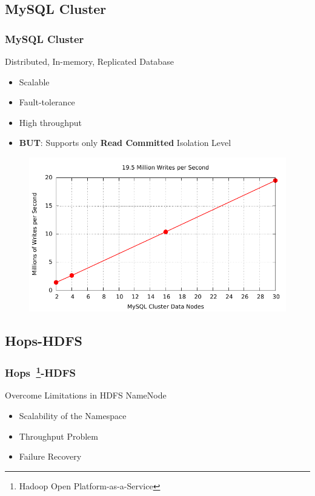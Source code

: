 \documentclass{beamer}
\begin{document}
\subsection{MySQL Cluster}
\begin{frame}
	\frametitle{MySQL Cluster}
	\begin{block}{Distributed, In-memory, Replicated Database}
			\begin{itemize}
				\item Scalable
				\item Fault-tolerance
				\item High throughput
				\item \textbf{BUT}: Supports only \textbf{Read Committed} Isolation Level
			\end{itemize}
	\end{block}
\begin{figure}[h!]
	\centering
	\includegraphics[scale=0.6]{figs/mysqlclusterbenchmark.pdf}
\end{figure}
\end{frame}

\subsection{Hops-HDFS}
\begin{frame}
	\frametitle{Hops~\footnote{Hadoop Open Platform-as-a-Service}-HDFS}
		\begin{block}{Overcome Limitations in HDFS NameNode}
			\begin{itemize}
				\item Scalability of the Namespace  
				\item Throughput Problem
				\item Failure Recovery
			\end{itemize}
		\end{block}
\end{frame}
\end{document}
